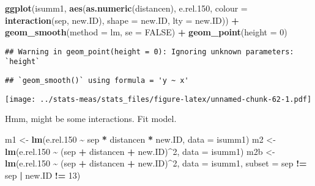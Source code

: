 \documentclass[
]{article}
\newenvironment{Shaded}{\begin{snugshade}}{\end{snugshade}}
\newcommand{\AttributeTok}[1]{\textcolor[rgb]{0.13,0.29,0.53}{#1}}
\newcommand{\ConstantTok}[1]{\textcolor[rgb]{0.56,0.35,0.01}{#1}}
\newcommand{\DecValTok}[1]{\textcolor[rgb]{0.00,0.00,0.81}{#1}}
\newcommand{\FloatTok}[1]{\textcolor[rgb]{0.00,0.00,0.81}{#1}}
\newcommand{\FunctionTok}[1]{\textcolor[rgb]{0.13,0.29,0.53}{\textbf{#1}}}
\newcommand{\NormalTok}[1]{#1}
\newcommand{\OtherTok}[1]{\textcolor[rgb]{0.56,0.35,0.01}{#1}}
\newcommand{\SpecialCharTok}[1]{\textcolor[rgb]{0.81,0.36,0.00}{\textbf{#1}}}
\newcommand{\StringTok}[1]{\textcolor[rgb]{0.31,0.60,0.02}{#1}}
\begin{document}
\begin{Shaded}
\begin{Highlighting}[]
\FunctionTok{ggplot}\NormalTok{(isumm1, }\FunctionTok{aes}\NormalTok{(}\FunctionTok{as.numeric}\NormalTok{(distancen), e.rel}\FloatTok{.150}\NormalTok{, }\AttributeTok{colour =} \FunctionTok{interaction}\NormalTok{(sep, new.ID), }\AttributeTok{shape =}\NormalTok{ new.ID, }\AttributeTok{lty =}\NormalTok{ new.ID)) }\SpecialCharTok{+}
    \FunctionTok{geom\_smooth}\NormalTok{(}\AttributeTok{method =}\NormalTok{ lm, }\AttributeTok{se =} \ConstantTok{FALSE}\NormalTok{) }\SpecialCharTok{+}
    \FunctionTok{geom\_point}\NormalTok{(}\AttributeTok{height =} \DecValTok{0}\NormalTok{)}
\end{Highlighting}
\end{Shaded}

\begin{verbatim}
## Warning in geom_point(height = 0): Ignoring unknown parameters: `height`
\end{verbatim}

\begin{verbatim}
## `geom_smooth()` using formula = 'y ~ x'
\end{verbatim}

\texttt{[image: ../stats-meas/stats\_files/figure-latex/unnamed-chunk-62-1.pdf]}

Hmm, might be some interactions. Fit model.

\begin{Shaded}
\begin{Highlighting}[]
\NormalTok{m1 }\OtherTok{\textless{}{-}} \FunctionTok{lm}\NormalTok{(e.rel}\FloatTok{.150} \SpecialCharTok{\textasciitilde{}}\NormalTok{ sep }\SpecialCharTok{*}\NormalTok{ distancen }\SpecialCharTok{*}\NormalTok{ new.ID, }\AttributeTok{data =}\NormalTok{ isumm1)}
\NormalTok{m2 }\OtherTok{\textless{}{-}} \FunctionTok{lm}\NormalTok{(e.rel}\FloatTok{.150} \SpecialCharTok{\textasciitilde{}}\NormalTok{ (sep }\SpecialCharTok{+}\NormalTok{ distancen }\SpecialCharTok{+}\NormalTok{ new.ID)}\SpecialCharTok{\^{}}\DecValTok{2}\NormalTok{, }\AttributeTok{data =}\NormalTok{ isumm1)}
\NormalTok{m2b }\OtherTok{\textless{}{-}} \FunctionTok{lm}\NormalTok{(e.rel}\FloatTok{.150} \SpecialCharTok{\textasciitilde{}}\NormalTok{ (sep }\SpecialCharTok{+}\NormalTok{ distancen }\SpecialCharTok{+}\NormalTok{ new.ID)}\SpecialCharTok{\^{}}\DecValTok{2}\NormalTok{, }\AttributeTok{data =}\NormalTok{ isumm1, }\AttributeTok{subset =}\NormalTok{ sep }\SpecialCharTok{!=} \StringTok{\textquotesingle{}sep\textquotesingle{}} \SpecialCharTok{|}\NormalTok{ new.ID }\SpecialCharTok{!=} \DecValTok{13}\NormalTok{)}
\end{Highlighting}
\end{Shaded}
\end{document}
